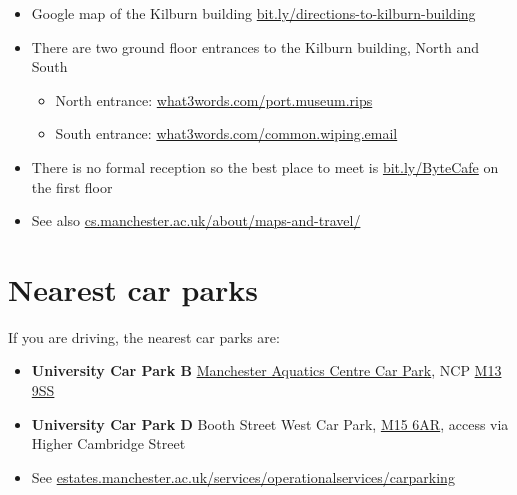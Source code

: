 \documentclass[12pt,]{book}
\providecommand{\tightlist}{%
  \setlength{\itemsep}{0pt}\setlength{\parskip}{0pt}}
\begin{document}
\begin{itemize}
\tightlist
\item
  Google map of the Kilburn building \href{http://bit.ly/directions-to-kilburn-building}{bit.ly/directions-to-kilburn-building}
\item
  There are two ground floor entrances to the Kilburn building, North and South

  \begin{itemize}
  \tightlist
  \item
    North entrance: \href{https://what3words.com/port.museum.rips}{what3words.com/port.museum.rips}
  \item
    South entrance: \href{https://what3words.com/common.wiping.email}{what3words.com/common.wiping.email}
  \end{itemize}
\item
  There is no formal reception so the best place to meet is \href{http://bit.ly/ByteCafe}{bit.ly/ByteCafe} on the first floor
\item
  See also \href{https://www.cs.manchester.ac.uk/about/maps-and-travel/}{cs.manchester.ac.uk/about/maps-and-travel/}
\end{itemize}

\hypertarget{nearest-car-parks}{%
\section{Nearest car parks}\label{nearest-car-parks}}

If you are driving, the nearest car parks are:

\begin{itemize}
\tightlist
\item
  \textbf{University Car Park B} \href{https://www.ncp.co.uk/find-a-car-park/car-parks/manchester-aquatic-centre-jv/}{Manchester Aquatics Centre Car Park}, NCP \href{http://maps.google.co.uk/maps?q=M13+9SS}{M13 9SS}
\item
  \textbf{University Car Park D} Booth Street West Car Park, \href{http://maps.google.co.uk/maps?q=M15+6AR}{M15 6AR}, access via Higher Cambridge Street
\item
  See \href{https://www.estates.manchester.ac.uk/services/operationalservices/carparking/}{estates.manchester.ac.uk/services/operationalservices/carparking}
\end{itemize}


\end{document}
